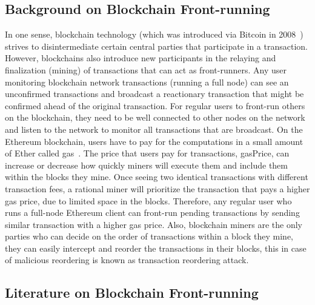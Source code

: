 \subsection{Background on Blockchain Front-running} \label{sec:Front Running on the Blockchains}

In one sense, blockchain technology (which was introduced via Bitcoin in 2008~\cite{nakamoto2008bitcoin}) strives to disintermediate certain central parties that participate in a transaction. However, blockchains also introduce new participants in the relaying and finalization (\ie mining) of transactions that can act as front-runners. Any user monitoring blockchain network transactions (\eg running a full node) can see an unconfirmed transactions and broadcast a reactionary transaction that might be confirmed ahead of the original transaction. For regular users to front-run others on the blockchain, they need to be well connected to other nodes on the network and listen to the network to monitor all transactions that are broadcast. On the Ethereum blockchain, users have to pay for the computations in a small amount of Ether called \textsf{gas}~\cite{AccountT67:online}. The price that users pay for transactions, \textsf{gasPrice}, can increase or decrease how quickly miners will execute them and include them within the blocks they mine. Once seeing two identical transactions with different transaction fees, a rational miner will prioritize the transaction that pays a higher gas price, due to limited space in the blocks. Therefore, any regular user who runs a full-node Ethereum client can front-run pending transactions by sending similar transaction with a higher gas price. Also, blockchain miners are the only parties who can decide on the order of transactions within a block they mine, they can easily intercept and reorder the transactions in their blocks, this in case of malicious reordering is known as \textsf{transaction reordering} attack. 

\subsection{Literature on Blockchain Front-running}



